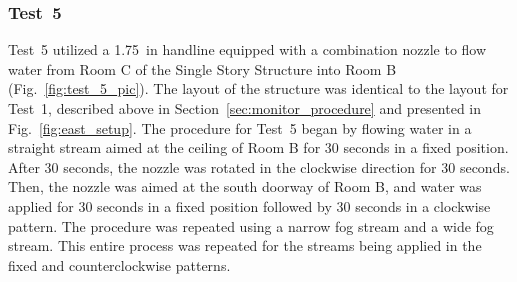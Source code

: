 \documentclass[12pt,oneside]{book}
\begin{document}
\subsubsection{Test~5}
Test~5 utilized a 1.75~in handline equipped with a combination nozzle to flow water from Room C of the Single Story Structure into Room B (Fig.~\ref{fig:test_5_pic}). The layout of the structure was identical to the layout for Test~1, described above in Section~\ref{sec:monitor_procedure} and presented in Fig.~\ref{fig:east_setup}. The procedure for Test~5 began by flowing water in a straight stream aimed at the ceiling of Room B for 30 seconds in a fixed position. After 30 seconds, the nozzle was rotated in the clockwise direction for 30 seconds. Then, the nozzle was aimed at the south doorway of Room B, and water was applied for 30 seconds in a fixed position followed by 30 seconds in a clockwise pattern. The procedure was repeated using a narrow fog stream and a wide fog stream. This entire process was repeated for the streams being applied in the fixed and counterclockwise patterns.
\end{document}
